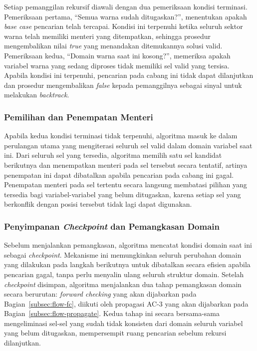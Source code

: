 Setiap pemanggilan rekursif diawali dengan dua pemeriksaan kondisi terminasi. Pemeriksaan pertama, ``Semua warna sudah ditugaskan?'', menentukan apakah \textit{base case} pencarian telah tercapai. Kondisi ini terpenuhi ketika seluruh sektor warna telah memiliki menteri yang ditempatkan, sehingga prosedur mengembalikan nilai \textit{true} yang menandakan ditemukannya solusi valid. Pemeriksaan kedua, ``Domain warna saat ini kosong?'', memeriksa apakah variabel warna yang sedang diproses tidak memiliki sel valid yang tersisa. Apabila kondisi ini terpenuhi, pencarian pada cabang ini tidak dapat dilanjutkan dan prosedur mengembalikan \textit{false} kepada pemanggilnya sebagai sinyal untuk melakukan \textit{backtrack}.

\subsubsection{Pemilihan dan Penempatan Menteri}

Apabila kedua kondisi terminasi tidak terpenuhi, algoritma masuk ke dalam perulangan utama yang mengiterasi seluruh sel valid dalam domain variabel saat ini. Dari seluruh sel yang tersedia, algoritma memilih satu sel kandidat berikutnya dan menempatkan menteri pada sel tersebut secara tentatif, artinya penempatan ini dapat dibatalkan apabila pencarian pada cabang ini gagal. Penempatan menteri pada sel tertentu secara langsung membatasi pilihan yang tersedia bagi variabel-variabel yang belum ditugaskan, karena setiap sel yang berkonflik dengan posisi tersebut tidak lagi dapat digunakan.

\subsubsection{Penyimpanan \textit{Checkpoint} dan Pemangkasan Domain}

Sebelum menjalankan pemangkasan, algoritma mencatat kondisi domain saat ini sebagai \textit{checkpoint}. Mekanisme ini memungkinkan seluruh perubahan domain yang dilakukan pada langkah berikutnya untuk dibatalkan secara efisien apabila pencarian gagal, tanpa perlu menyalin ulang seluruh struktur domain. Setelah \textit{checkpoint} disimpan, algoritma menjalankan dua tahap pemangkasan domain secara berurutan: \textit{forward checking} yang akan dijabarkan pada Bagian~\ref{subsec:flow-fc}, diikuti oleh propagasi AC-3 yang akan dijabarkan pada Bagian~\ref{subsec:flow-propagate}. Kedua tahap ini secara bersama-sama mengeliminasi sel-sel yang sudah tidak konsisten dari domain seluruh variabel yang belum ditugaskan, mempersempit ruang pencarian sebelum rekursi dilanjutkan.

